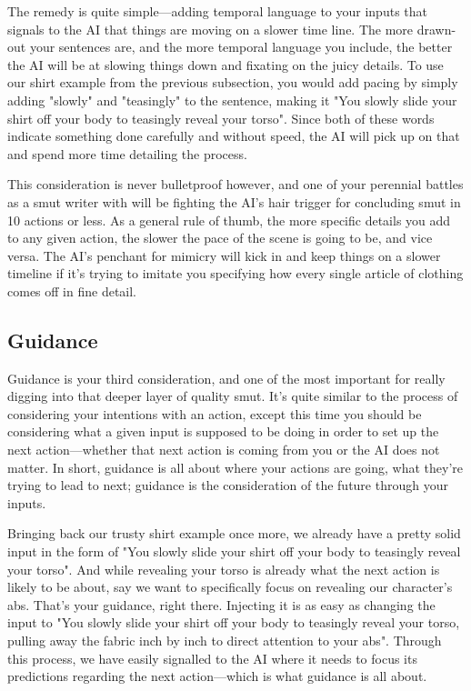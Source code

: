 ﻿\documentclass[Coomer-main.tex]{subfiles}
\begin{document}
The remedy is quite simple—adding temporal language to your inputs that signals to the AI that things are moving on a slower time line. The more drawn-out your sentences are, and the more temporal language you include, the better the AI will be at slowing things down and fixating on the juicy details. To use our shirt example from the previous subsection, you would add pacing by simply adding "slowly" and "teasingly" to the sentence, making it "You slowly slide your shirt off your body to teasingly reveal your torso". Since both of these words indicate something done carefully and without speed, the AI will pick up on that and spend more time detailing the process.

This consideration is never bulletproof however, and one of your perennial battles as a smut writer with \aid will be fighting the AI's hair trigger for concluding smut in 10 actions or less. As a general rule of thumb, the more specific details you add to any given action, the slower the pace of the scene is going to be, and vice versa. The AI’s penchant for mimicry will kick in and keep things on a slower timeline if it’s trying to imitate you specifying how every single article of clothing comes off in fine detail.

\subsection{Guidance}

Guidance is your third consideration, and one of the most important for really digging into that deeper layer of quality smut. It's quite similar to the process of considering your intentions with an action, except this time you should be considering what a given input is supposed to be doing in order to set up the next action—whether that next action is coming from you or the AI does not matter. In short, guidance is all about where your actions are going, what they’re trying to lead to next; guidance is the consideration of the future through your inputs.

Bringing back our trusty shirt example once more, we already have a pretty solid input in the form of "You slowly slide your shirt off your body to teasingly reveal your torso". And while revealing your torso is already what the next action is likely to be about, say we want to specifically focus on revealing our character's abs. That's your guidance, right there. Injecting it is as easy as changing the input to "You slowly slide your shirt off your body to teasingly reveal your torso, pulling away the fabric inch by inch to direct attention to your abs". Through this process, we have easily signalled to the AI where it needs to focus its predictions regarding the next action—which is what guidance is all about.
\end{document}
